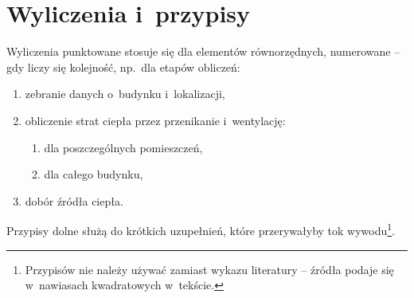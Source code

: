 \section{Wyliczenia i~przypisy}

Wyliczenia punktowane stosuje się dla elementów równorzędnych, numerowane
-- gdy liczy się kolejność, np.\ dla etapów obliczeń:
\begin{enumerate}
  \item zebranie danych o~budynku i~lokalizacji,
  \item obliczenie strat ciepła przez przenikanie i~wentylację:
    \begin{enumerate}
      \item dla poszczególnych pomieszczeń,
      \item dla całego budynku,
    \end{enumerate}
  \item dobór źródła ciepła.
\end{enumerate}
Przypisy dolne służą do krótkich uzupełnień, które przerywałyby tok
wywodu\footnote{Przypisów nie należy używać zamiast wykazu literatury --
źródła podaje się w~nawiasach kwadratowych w~tekście.}.
